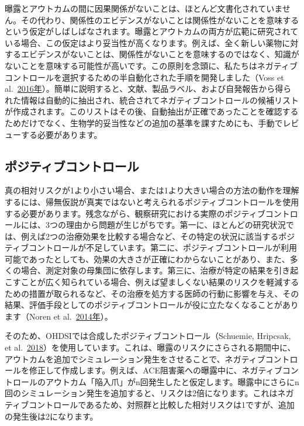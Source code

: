 \documentclass[
  11pt]{book}
\theoremstyle{definition}
\theoremstyle{definition}
\theoremstyle{definition}
\theoremstyle{definition}
\theoremstyle{remark}
\begin{document}
曝露とアウトカムの間に因果関係がないことは、ほとんど文書化されていません。その代わり、関係性のエビデンスがないことは関係性がないことを意味するという仮定がしばしばなされます。曝露とアウトカムの両方が広範に研究されている場合、この仮定はより妥当性が高くなります。例えば、全く新しい薬物に対するエビデンスがないことは、関係性がないことを意味するのではなく、知識がないことを意味する可能性が高いです。この原則を念頭に、私たちはネガティブコントロールを選択するための半自動化された手順を開発しました（Voss et al.~\href{https://ohdsi.github.io/TheBookOfOhdsi/MethodValidity.html\#ref-voss_2016}{2016年}）。簡単に説明すると、文献、製品ラベル、および自発報告から得られた情報は自動的に抽出され、統合されてネガティブコントロールの候補リストが作成されます。このリストはその後、自動抽出が正確であったことを確認するためだけでなく、生物学的妥当性などの追加の基準を課すためにも、手動でレビューする必要があります。

\subsection{ポジティブコントロール}\label{PositiveControls}


真の相対リスクが1より小さい場合、または1より大きい場合の方法の動作を理解するには、帰無仮説が真実ではないと考えられるポジティブコントロールを使用する必要があります。残念ながら、観察研究における実際のポジティブコントロールには、3つの理由から問題が生じがちです。第一に、ほとんどの研究状況では、例えば2つの治療効果を比較する場合など、その特定の状況に該当するポジティブコントロールが不足しています。第二に、ポジティブコントロールが利用可能であったとしても、効果の大きさが正確にわからないことがあり、また、多くの場合、測定対象の母集団に依存します。第三に、治療が特定の結果を引き起こすことが広く知られている場合、例えば望ましくない結果のリスクを軽減するための措置が取られるなど、その治療を処方する医師の行動に影響を与え、その結果、評価手段としてのポジティブコントロールが役に立たなくなることがあります（Noren et al.~\href{https://ohdsi.github.io/TheBookOfOhdsi/MethodValidity.html\#ref-noren_2014}{2014年}）。

そのため、OHDSIでは合成したポジティブコントロール（Schuemie, Hripcsak, et al.~\href{https://ohdsi.github.io/TheBookOfOhdsi/MethodValidity.html\#ref-schuemie_2018}{2018}）を使用しています。これは、曝露のリスクにさらされる期間中に、アウトカムを追加でシミュレーション発生をさせることで、ネガティブコントロールを修正して作成します。例えば、ACE阻害薬への曝露中に、ネガティブコントロールのアウトカム「陥入爪」がn回発生したと仮定します。曝露中にさらにn回のシミュレーション発生を追加すると、リスクは2倍になります。これはネガティブコントロールであるため、対照群と比較した相対リスクは1ですが、追加の発生後は2になります。
\end{document}
